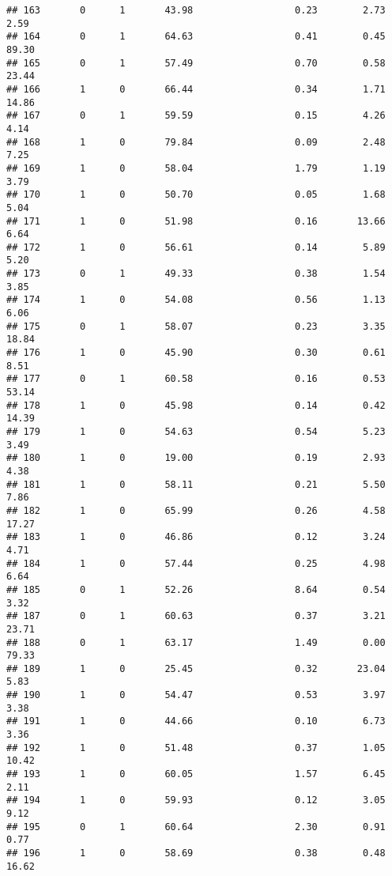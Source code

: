 \documentclass[
]{article}
\begin{document}
\begin{verbatim}
## 163       0      1       43.98                  0.23        2.73        2.59
## 164       0      1       64.63                  0.41        0.45       89.30
## 165       0      1       57.49                  0.70        0.58       23.44
## 166       1      0       66.44                  0.34        1.71       14.86
## 167       0      1       59.59                  0.15        4.26        4.14
## 168       1      0       79.84                  0.09        2.48        7.25
## 169       1      0       58.04                  1.79        1.19        3.79
## 170       1      0       50.70                  0.05        1.68        5.04
## 171       1      0       51.98                  0.16       13.66        6.64
## 172       1      0       56.61                  0.14        5.89        5.20
## 173       0      1       49.33                  0.38        1.54        3.85
## 174       1      0       54.08                  0.56        1.13        6.06
## 175       0      1       58.07                  0.23        3.35       18.84
## 176       1      0       45.90                  0.30        0.61        8.51
## 177       0      1       60.58                  0.16        0.53       53.14
## 178       1      0       45.98                  0.14        0.42       14.39
## 179       1      0       54.63                  0.54        5.23        3.49
## 180       1      0       19.00                  0.19        2.93        4.38
## 181       1      0       58.11                  0.21        5.50        7.86
## 182       1      0       65.99                  0.26        4.58       17.27
## 183       1      0       46.86                  0.12        3.24        4.71
## 184       1      0       57.44                  0.25        4.98        6.64
## 185       0      1       52.26                  8.64        0.54        3.32
## 187       0      1       60.63                  0.37        3.21       23.71
## 188       0      1       63.17                  1.49        0.00       79.33
## 189       1      0       25.45                  0.32       23.04        5.83
## 190       1      0       54.47                  0.53        3.97        3.38
## 191       1      0       44.66                  0.10        6.73        3.36
## 192       1      0       51.48                  0.37        1.05       10.42
## 193       1      0       60.05                  1.57        6.45        2.11
## 194       1      0       59.93                  0.12        3.05        9.12
## 195       0      1       60.64                  2.30        0.91        0.77
## 196       1      0       58.69                  0.38        0.48       16.62

\end{verbatim}
\end{document}
